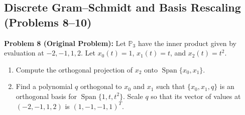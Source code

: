 \documentclass[11pt, letterpaper]{article}
\theoremstyle{definition}
\theoremstyle{remark}
\begin{document}
\subsection{Discrete Gram--Schmidt and Basis Rescaling (Problems 8--10)}

\textbf{Problem 8 (Original Problem):} Let $\mathbb{P}_3$ have the inner product given by evaluation at $-2, -1, 1, 2$. Let $x_0(t) = 1$, $x_1(t) = t$, and $x_2(t) = t^2$.
\begin{enumerate}[label=(\alph*)]
    \item Compute the orthogonal projection of $x_2$ onto $\operatorname{Span}\{x_0, x_1\}$.
    \item Find a polynomial $q$ orthogonal to $x_0$ and $x_1$ such that $\{x_0, x_1, q\}$ is an orthogonal basis for $\operatorname{Span}\{1, t, t^2\}$. Scale $q$ so that its vector of values at $(-2, -1, 1, 2)$ is $(1, -1, -1, 1)^T$.
\end{enumerate}
\end{document}
